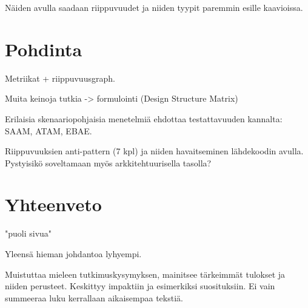 \documentclass[finnish]{tktltiki2}
\theoremstyle{definition}
\theoremstyle{remark}
\begin{document}
\noindent
Näiden avulla saadaan riippuvuudet ja niiden tyypit paremmin esille kaavioissa. 





\section{Pohdinta}

Metriikat + riippuvuusgraph.

Muita keinoja tutkia -> formulointi (Design Structure Matrix) \citep{mo_mapping_2013}

Erilaisia skenaariopohjaisia menetelmiä ehdottaa \citep[s. 8-9]{mattsson2006software} testattavuuden kannalta: SAAM, ATAM, EBAE.

Riippuvuuksien anti-pattern (7 kpl) ja niiden havaitseminen lähdekoodin avulla. Pystyisikö soveltamaan myös arkkitehtuurisella tasolla? \citep{binkley_dependence_2008} 

\section{Yhteenveto}
"puoli sivua"

Yleensä hieman johdantoa lyhyempi.

Muistuttaa mieleen tutkimuskysymyksen, mainitsee tärkeimmät tulokset ja niiden perusteet. Keskittyy impaktiin ja esimerkiksi suosituksiin. Ei vain summeeraa luku kerrallaan aikaisempaa tekstiä.



%
%
% 
%

%






% 
\end{document}
